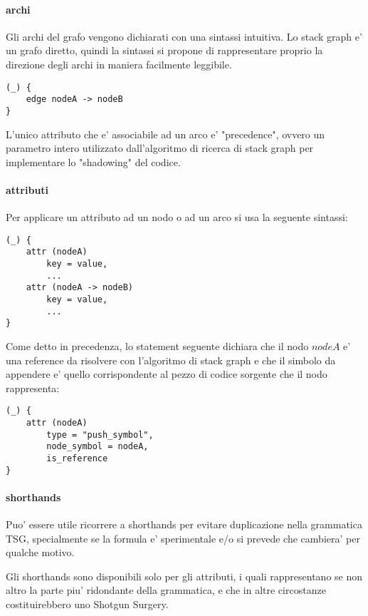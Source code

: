 \paragraph{archi}

Gli archi del grafo vengono dichiarati con una sintassi intuitiva.
Lo stack graph e' un grafo diretto, quindi la sintassi si propone di rappresentare proprio la direzione degli archi in maniera facilmente leggibile.

\begin{verbatim}
(_) {
    edge nodeA -> nodeB
}
\end{verbatim}

L'unico attributo che e' associabile ad un arco e' "precedence", ovvero un parametro intero utilizzato dall'algoritmo di ricerca di stack graph per implementare lo "shadowing" del codice.

\paragraph{attributi}

Per applicare un attributo ad un nodo o ad un arco si usa la seguente sintassi:

\begin{verbatim}
(_) {
    attr (nodeA)
        key = value,
        ...
    attr (nodeA -> nodeB)
        key = value,
        ...
}
\end{verbatim}

Come detto in precedenza, lo statement seguente dichiara che il nodo $nodeA$ e' una reference da risolvere con l'algoritmo di stack graph e che il simbolo da appendere e' quello corrispondente al pezzo di codice sorgente che il nodo rappresenta:

\begin{verbatim}
(_) {
    attr (nodeA)
        type = "push_symbol",
        node_symbol = nodeA,
        is_reference
}
\end{verbatim}

\paragraph{shorthands}
Puo' essere utile ricorrere a shorthands per evitare duplicazione nella grammatica TSG, specialmente se la formula e' sperimentale e/o si prevede che cambiera' per qualche motivo.

Gli shorthands sono disponibili solo per gli attributi, i quali rappresentano se non altro la parte piu' ridondante della grammatica, e che in altre circostanze costituirebbero uno Shotgun Surgery.

